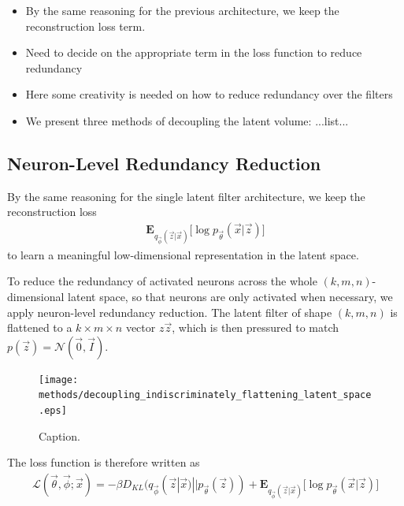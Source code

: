 \begin{itemize}
\item By the same reasoning for the previous architecture, we keep the reconstruction loss term. 
\item Need to decide on the appropriate term in the loss function to reduce redundancy
\item Here some creativity is needed on how to reduce redundancy over the filters
\item We present three methods of decoupling the latent volume: ...list...
\end{itemize}

%
%
\subsection{Neuron-Level Redundancy Reduction}

By the same reasoning for the single latent filter architecture, we keep the reconstruction loss 
\begin{align}
\mathbf{E}_{q_{\vec{\phi}}(\vec{z}|\vec{x})}\big[\log p_{\vec{\theta}}(\vec{x} | \vec{z}) \big]
\end{align}
to learn a meaningful low-dimensional representation in the latent space.

To reduce the redundancy of activated neurons across the whole $(k, m, n)$-dimensional latent space, so that neurons are only activated when necessary, we apply neuron-level redundancy reduction. The latent filter of shape $(k, m, n)$ is flattened to a $k \times m \times n$ vector $z\vec{z}$, which is then pressured to match $p(\vec{z}) = \mathcal{N}(\vec{0}, \vec{I})$.

\begin{figure}[h!]
\centering
\captionsetup{justification=centering}
\texttt{[image: methods/decoupling\_indiscriminately\_flattening\_latent\_space.eps]}
\caption{Caption.}
\label{fig:decoupling_indiscriminately_flattening_latent_space}
\end{figure}

The loss function is therefore written as 
\begin{align}
\mathcal{L}(\vec{\theta}, \vec{\phi}; \vec{x}) = -\beta D_{KL}(q_{\vec{\phi}}(\vec{z}|\vec{x}) || p_{\vec{\theta}}(\vec{z})) + \mathbf{E}_{q_{\vec{\phi}}(\vec{z}|\vec{x})}\big[\log p_{\vec{\theta}}(\vec{x} | \vec{z}) \big]
\end{align}


%
%
